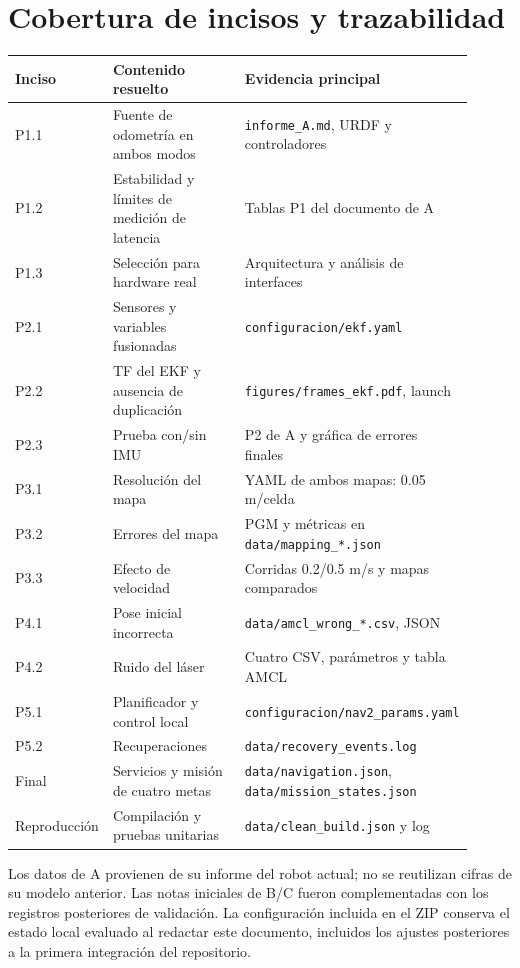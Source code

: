 \documentclass[11pt,a4paper]{article}
\newcommand{\archivo}[1]{\nolinkurl{#1}}
\begin{document}
\section{Cobertura de incisos y trazabilidad}
\begin{longtable}{p{0.15\linewidth}p{0.34\linewidth}p{0.42\linewidth}}
\toprule Inciso & Contenido resuelto & Evidencia principal\\\midrule\endhead
P1.1 & Fuente de odometría en ambos modos & \archivo{informe_A.md}, URDF y controladores\\
P1.2 & Estabilidad y límites de medición de latencia & Tablas P1 del documento de A\\
P1.3 & Selección para hardware real & Arquitectura y análisis de interfaces\\
P2.1 & Sensores y variables fusionadas & \archivo{configuracion/ekf.yaml}\\
P2.2 & TF del EKF y ausencia de duplicación & \archivo{figures/frames_ekf.pdf}, launch\\
P2.3 & Prueba con/sin IMU & P2 de A y gráfica de errores finales\\
P3.1 & Resolución del mapa & YAML de ambos mapas: 0.05 m/celda\\
P3.2 & Errores del mapa & PGM y métricas en \archivo{data/mapping_*.json}\\
P3.3 & Efecto de velocidad & Corridas 0.2/0.5 m/s y mapas comparados\\
P4.1 & Pose inicial incorrecta & \archivo{data/amcl_wrong_*.csv}, JSON\\
P4.2 & Ruido del láser & Cuatro CSV, parámetros y tabla AMCL\\
P5.1 & Planificador y control local & \archivo{configuracion/nav2_params.yaml}\\
P5.2 & Recuperaciones & \archivo{data/recovery_events.log}\\
Final & Servicios y misión de cuatro metas & \archivo{data/navigation.json}, \archivo{data/mission_states.json}\\
Reproducción & Compilación y pruebas unitarias & \archivo{data/clean_build.json} y log\\\bottomrule
\end{longtable}
Los datos de A provienen de su informe del robot actual; no se reutilizan cifras de su modelo anterior. Las notas iniciales de B/C fueron complementadas con los registros posteriores de validación. La configuración incluida en el ZIP conserva el estado local evaluado al redactar este documento, incluidos los ajustes posteriores a la primera integración del repositorio.
\end{document}
